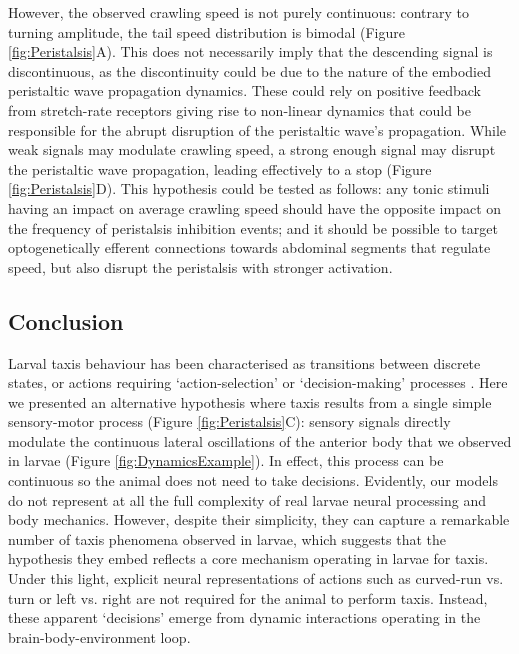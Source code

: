 \documentclass[11pt,a4paper]{article}
\newcommand{\todoKL}[1]{\todo[author=KL,color=blue!40, size=\tiny,inline]{#1}}
\newcommand{\todoBW}[1]{\todo[author=BW,color=orange, size=\tiny,inline]{#1}}
\begin{document}
However, the observed crawling speed is not purely continuous: contrary to turning amplitude, the tail speed distribution is bimodal (Figure \ref{fig:Peristalsis}A).
 This does not necessarily imply that the descending signal is discontinuous, as the discontinuity could be due to the nature of the embodied peristaltic wave propagation dynamics. These could rely on positive feedback from stretch-rate receptors \citep{ross2015model} giving rise to non-linear dynamics that could be responsible for the abrupt disruption of the peristaltic wave's propagation. While weak signals may modulate crawling speed, a strong enough signal may disrupt the peristaltic wave propagation, leading effectively to a stop (Figure \ref{fig:Peristalsis}D).
  This hypothesis could be tested as follows: any tonic stimuli having an impact on average crawling speed should have the opposite impact on the frequency of peristalsis inhibition events; and it should be possible to target optogenetically efferent connections towards abdominal segments that regulate speed, but also disrupt the peristalsis with stronger activation.

\subsection{Conclusion}
Larval taxis behaviour has been characterised as transitions between discrete states, or actions \citep{green1983organization,sawin1994sensorimotor, cobbwhatandhow1999, gomez2012active}  requiring ‘action-selection’ or ‘decision-making’ processes \citep{gomez2014multilevel}. Here we presented an alternative hypothesis where taxis results from a single simple sensory-motor process (Figure \ref{fig:Peristalsis}C): sensory signals directly modulate the continuous lateral oscillations of the anterior body that we observed in larvae (Figure \ref{fig:DynamicsExample}). In effect, this process can be continuous so the animal does not need to take decisions. 
Evidently, our models do not represent at all the full complexity of real larvae neural processing and body mechanics. However, despite their simplicity, they can capture a remarkable number of taxis phenomena observed in larvae, which suggests that the hypothesis they embed reflects a core mechanism operating in larvae for taxis. Under this light, explicit neural representations of actions such as curved-run vs. turn or left vs. right are not required for the animal to perform taxis. Instead, these apparent `decisions' emerge from dynamic interactions operating in the brain-body-environment loop.
\end{document}
